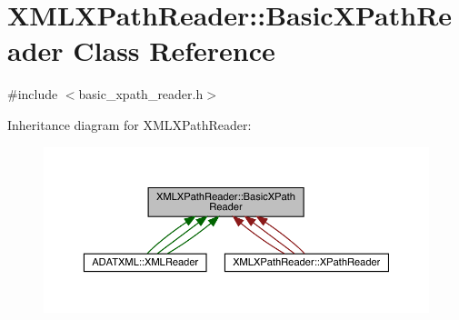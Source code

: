 \hypertarget{classXMLXPathReader_1_1BasicXPathReader}{}\section{X\+M\+L\+X\+Path\+Reader\+:\+:Basic\+X\+Path\+Reader Class Reference}
\label{classXMLXPathReader_1_1BasicXPathReader}


{\ttfamily \#include $<$basic\+\_\+xpath\+\_\+reader.\+h$>$}



Inheritance diagram for X\+M\+L\+X\+Path\+Reader\+:
\nopagebreak
\begin{figure}[H]
\begin{center}
\leavevmode
\includegraphics[width=350pt]{db/d44/classXMLXPathReader_1_1BasicXPathReader__inherit__graph}
\end{center}
\end{figure}
